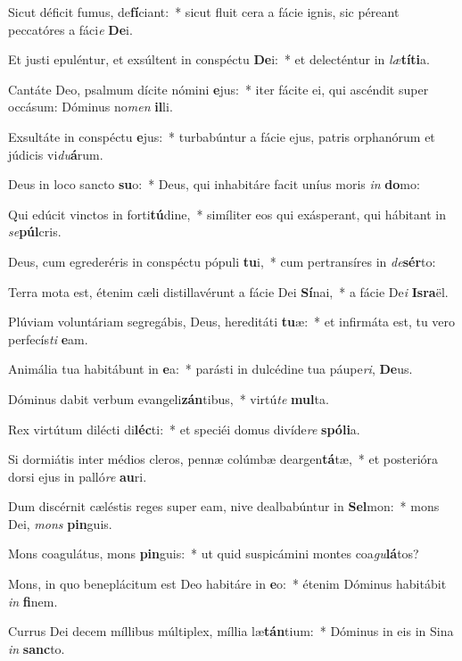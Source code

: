 \item Sicut déficit fumus, de\textbf{fí}ciant:~* sicut fluit cera a fácie ignis, sic péreant peccatóres a fáci\textit{e} \textbf{De}i.
\item Et justi epuléntur, et exsúltent in conspéctu \textbf{De}i:~* et delecténtur in \textit{læ}\textbf{tí}\textbf{ti}a.
\item Cantáte Deo, psalmum dícite nómini \textbf{e}jus:~* iter fácite ei, qui ascéndit super occásum: Dóminus no\textit{men} \textbf{il}li.
\item Exsultáte in conspéctu \textbf{e}jus:~* turbabúntur a fácie ejus, patris orphanórum et júdicis vi\textit{du}\textbf{á}rum.
\item Deus in loco sancto \textbf{su}o:~* Deus, qui inhabitáre facit uníus moris \textit{in} \textbf{do}mo:
\item Qui edúcit vinctos in forti\textbf{tú}dine,~* simíliter eos qui exásperant, qui hábitant in \textit{se}\textbf{púl}cris.
\item Deus, cum egrederéris in conspéctu pópuli \textbf{tu}i,~* cum pertransíres in \textit{de}\textbf{sér}to:
\item Terra mota est, étenim cæli distillavérunt a fácie Dei \textbf{Sí}nai,~* a fácie De\textit{i} \textbf{Is}\textbf{ra}ël.
\item Plúviam voluntáriam segregábis, Deus, hereditáti \textbf{tu}æ:~* et infirmáta est, tu vero perfecís\textit{ti} \textbf{e}am.
\item Animália tua habitábunt in \textbf{e}a:~* parásti in dulcédine tua páupe\textit{ri}, \textbf{De}us.
\item Dóminus dabit verbum evangeli\textbf{zán}tibus,~* virtú\textit{te} \textbf{mul}ta.
\item Rex virtútum dilécti di\textbf{léc}ti:~* et speciéi domus divíde\textit{re} \textbf{spó}\textbf{li}a.
\item Si dormiátis inter médios cleros, pennæ colúmbæ deargen\textbf{tá}tæ,~* et posterióra dorsi ejus in palló\textit{re} \textbf{au}ri.
\item Dum discérnit cæléstis reges super eam, nive dealbabúntur in \textbf{Sel}mon:~* mons Dei, \textit{mons} \textbf{pin}guis.
\item Mons coagulátus, mons \textbf{pin}guis:~* ut quid suspicámini montes coa\textit{gu}\textbf{lá}tos?
\item Mons, in quo beneplácitum est Deo habitáre in \textbf{e}o:~* étenim Dóminus habitábit \textit{in} \textbf{fi}nem.
\item Currus Dei decem míllibus múltiplex, míllia læ\textbf{tán}tium:~* Dóminus in eis in Sina \textit{in} \textbf{sanc}to.
